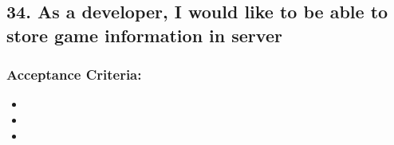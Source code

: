 \subsection*{34. As a developer, I would like to be able to store game information in server}


\subsubsection*{Acceptance Criteria:}

\begin{itemize}
\item 
\item 
\item 
\end{itemize}
